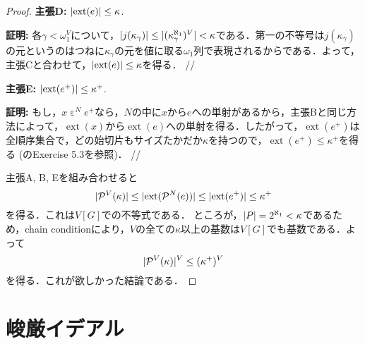 \documentclass[uplatex]{jsarticle}
\newcommand{\Pow}{\mathcal{P}}
\newcommand{\ext}{\operatorname{ext}}
\DeclarePairedDelimiter\abs{\lvert}{\rvert}
\theoremstyle{definition}
\begin{document}
\begin{proof}
		\par \textbf{主張D: } $\abs{\ext(e)} \le \kappa$.
		\par \textbf{証明: } 各$\gamma < \omega_1^V$について，$\abs{j(\kappa_\gamma)} \le \abs{(\kappa_\gamma^{\aleph_1})^V} < \kappa$である．第一の不等号は$j(\kappa_\gamma)$の元というのはつねに$\kappa_\gamma$の元を値に取る$\omega_1$列で表現されるからである．よって，主張Cと合わせて，$\abs{\ext(e)} \le \kappa$を得る．  \hfill //
		
		\par \textbf{主張E: } $\abs{\ext(e^+)} \le \kappa^+$.
		\par \textbf{証明: } もし，$x \mathrel{\varepsilon}^N e^+$なら，$N$の中に$x$から$e$への単射があるから，主張Bと同じ方法によって，$\ext(x)$から$\ext(e)$への単射を得る．したがって，$\ext(e^+)$は全順序集合で，どの始切片もサイズたかだか$\kappa$を持つので，$\ext(e^+) \le \kappa^+$を得る (\cite{jech2006set}のExercise 5.3を参照)．	  \hfill //
		
		主張A, B, Eを組み合わせると
		\[
			\abs{\Pow^V(\kappa)} \le \abs{\ext(\Pow^N(e))} \le \abs{\ext(e^+)} \le \kappa^+
		\]
		を得る．これは$V[G]$での不等式である．
		ところが，$\abs{P} = 2^{\aleph_1} < \kappa$であるため，chain conditionにより，$V$の全ての$\kappa$以上の基数は$V[G]$でも基数である．よって
		\[
		\abs{\Pow^V(\kappa)}^V \le (\kappa^+)^V
		\]
		を得る．これが欲しかった結論である．
	 \end{proof}
	
	\section{峻厳イデアル}
	
	\nocite{*}
	\printbibliography[title={参考文献}]

	
\end{document}
